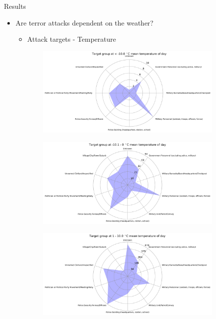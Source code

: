 \documentclass{beamer}
\begin{document}
\begin{frame}{Results}
	\begin{itemize}
		\item 
		Are terror attacks dependent on the weather?
		\begin{itemize}
			\item Attack targets - Temperature
		\end{itemize}
	\end{itemize}
	
	\begin{figure}

		\begin{subfigure}[b]{0.3\textwidth}
			\includegraphics[width=\textwidth]{Temp-Target/temp<-100_starDiagram}
		\end{subfigure}
		\begin{subfigure}[b]{0.3\textwidth}
			\includegraphics[width=\textwidth]{Temp-Target/temp-101-0_starDiagram}
		\end{subfigure}
		\begin{subfigure}[b]{0.3\textwidth}
			\includegraphics[width=\textwidth]{Temp-Target/temp1-100_starDiagram}

\end{subfigure}
\end{figure}
\end{frame}
\end{document}
